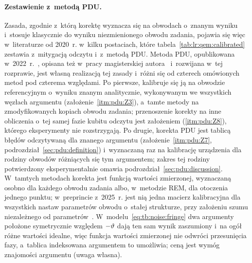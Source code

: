 \paragraph{Zestawienie z~metodą PDU.}
Zasada, zgodnie z~którą korektę wyznacza się na obwodach o~znanym wyniku i~stosuje klasycznie do wyniku niezmienionego obwodu zadania, pojawia się więc w~literaturze od 2020~r. w~kilku postaciach, które tabela~\ref{tab:lr:qem:calibrated} zestawia z~mitygacją odczytu i~z~metodą PDU.
Metoda PDU, opublikowana w~2022~r.~\cite{werner_experiment_driven_2022}, opisana też w~pracy magisterskiej autora~\cite{werner_magisterka_2022} i~rozwijana w~tej rozprawie, jest własną realizacją tej zasady i~różni się od czterech omówionych metod pod czterema względami.
Po pierwsze, kalibruje się ją na obwodzie referencyjnym o~wyniku znanym analitycznie, wykonywanym we wszystkich węzłach argumentu (założenie~\ref{itm:pdu:Z3}), a~tamte metody na zmodyfikowanych kopiach obwodu zadania; przenoszenie korekty na inne obliczenia o~tej samej fazie kubitu odczytu jest założeniem (\ref{itm:pdu:Z8}), którego eksperymenty nie rozstrzygają.
Po drugie, korekta PDU jest tablicą błędów odczytywaną dla znanego argumentu (założenie~\ref{itm:pdu:Z7}, podrozdział~\ref{sec:pdu:definition}) i~wyznaczaną raz na kalibrację urządzenia dla rodziny obwodów różniących się tym argumentem; zakres tej rodziny potwierdzony eksperymentalnie omawia podrozdział~\ref{sec:pdu:discussion}.
W~tamtych metodach korekta jest funkcją wartości zmierzonej, wyznaczaną osobno dla każdego obwodu zadania albo, w~metodzie REM, dla otoczenia jednego punktu; w~preprincie z~2025~r. jest nią jedna macierz kalibracyjna dla wszystkich nastaw parametrów obwodu o~stałej strukturze, przy założeniu szumu niezależnego od parametrów~\cite{shen_circuit_2025}.
W~modelu~\eqref{eq:tb:noise:fringe} dwa argumenty położone symetrycznie względem $-\vartheta$ dają ten sam wynik zaszumiony i~na ogół różne wartości idealne, więc funkcja wartości zmierzonej nie odwróci przesunięcia fazy, a~tablica indeksowana argumentem to umożliwia; ceną jest wymóg znajomości argumentu (uwaga własna).
